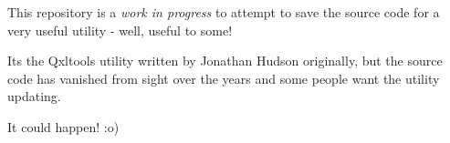 This repository is a {\itshape work in progress} to attempt to save the source code for a very useful utility -\/ well, useful to some!

It\textquotesingle{}s the {\ttfamily Qxltools} utility written by Jonathan Hudson originally, but the source code has vanished from sight over the years and some people want the utility updating.

It could happen! \+:o) 